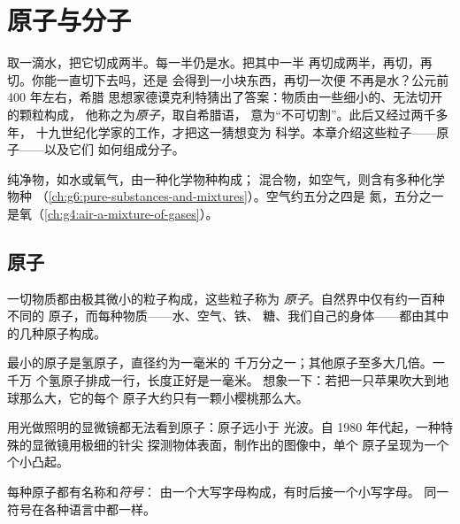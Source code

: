 \chapter{原子与分子}\label{ch:g7:atoms-and-molecules}

取一滴水，把它切成两半。每一半仍是水。把其中一半
再切成两半，再切，再切。你能一直切下去吗，还是
会得到一小块东西，再切一次便
不再是水？公元前 400 年左右，希腊
思想家德谟克利特猜出了答案：物质由一些细小的、无法切开的颗粒构成，
他称之为\emph{原子}，取自希腊语，
意为“不可切割”。此后又经过两千多年，
十九世纪化学家的工作，才把这一猜想变为
科学。本章介绍这些粒子——原子——以及它们
如何组成分子。

\begin{recall}
纯净物，如水或氧气，由一种化学物种构成；
混合物，如空气，则含有多种化学物种
（\cref{ch:g6:pure-substances-and-mixtures}）。空气约五分之四是
氮，五分之一是氧（\cref{ch:g4:air-a-mixture-of-gases}）。
\end{recall}

\section{原子}

\begin{definition}[原子]\label{def:g7:atoms-and-molecules:atom}
一切物质都由极其微小的粒子构成，这些粒子称为
\emph{原子}。自然界中仅有约一百种不同的
原子，而每种物质——水、空气、铁、
糖、我们自己的身体——都由其中的几种原子构成。
\end{definition}

\begin{proposition}[原子很小]\label{prop:g7:atoms-and-molecules:tiny}
最小的原子是氢原子，直径约为一毫米的
千万分之一；其他原子至多大几倍。一千万
个氢原子排成一行，长度正好是一毫米。
想象一下：若把一只苹果吹大到地球那么大，它的每个
原子大约只有一颗小樱桃那么大。
\end{proposition}

\begin{remark}[看不见却看得见]\label{rem:g7:atoms-and-molecules:seen}
用光做照明的显微镜都无法看到原子：原子远小于
光波。自 1980 年代起，一种特殊的显微镜用极细的针尖
探测物体表面，制作出的图像中，单个
原子呈现为一个个小凸起。
\end{remark}

\begin{definition}[原子符号]\label{def:g7:atoms-and-molecules:symbol}
每种原子都有名称和\emph{符号}：
由一个大写字母构成，有时后接一个小写字母。
同一符号在各种语言中都一样。
\end{definition}

